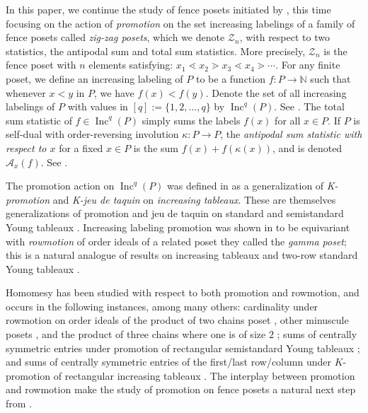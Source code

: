 \documentclass[11pt]{amsart}
\theoremstyle{definition}
\DeclareMathOperator{\Inc}{\mathrm{Inc}}
\begin{document}
In this paper, we continue the study of fence posets initiated by \cite{elizalde2021rowmotion}, this time focusing on the action of \emph{promotion} on the set increasing labelings of a family of fence posets called \emph{zig-zag posets}, which we denote $\mathcal{Z}_n$, with respect to two statistics, the antipodal sum and total sum statistics.
More precisely, $\mathcal{Z}_n$ is the fence poset with $n$ elements satisfying: $x_1\lessdot x_2 \gtrdot x_3\lessdot x_4\gtrdot \cdots$.
For any finite poset, we define an increasing labeling of $P$ to be a function $f: P \to \mathbb{N}$ such that whenever $x < y$ in $P$, we have $f(x) < f(y)$. Denote  the set of all increasing labelings of $P$ with values in $[q]:=\{1,2,\ldots,q\}$ by  $\Inc^q(P)$.
See .
The total sum statistic of $f\in \Inc^q(P)$ simply sums the labels $f(x)$ for all $x\in P$.
If $P$ is self-dual with order-reversing involution $\kappa:P\to P$,  the \emph{antipodal sum statistic with respect to $x$} for a fixed $x \in P$ is the sum $f(x)+f(\kappa(x))$, and is denoted  $\mathcal{A}_x(f)$.
See .



The promotion action on $\Inc^q(P)$ was defined in \cite{dilks2019rowmotion} as a generalization of \emph{K-promotion} \cite{Pechenik2014} and \emph{K-jeu de taquin} on \cite{TY2009} \emph{increasing tableaux}. These are themselves generalizations of promotion and jeu de taquin on standard and semistandard Young tableaux \cite{Sch1972}. Increasing labeling promotion was shown in \cite{dilks2019rowmotion} to be equivariant with \emph{rowmotion} of order ideals of a related poset they called the \emph{gamma poset}; this is a natural analogue of results on increasing tableaux \cite{dilks2017resonance} and two-row standard Young tableaux \cite{SW2012}.

Homomesy has been studied with respect to both promotion and rowmotion, and occurs in the following instances, among many others: cardinality under rowmotion on order ideals of the product of two chains poset \cite{PR2015}, other minuscule posets \cite{RushWang}, and the product of three chains where one is of size $2$ \cite{Vorland};  sums of centrally symmetric entries under promotion of rectangular semistandard Young tableaux \cite{BPS}; and sums of centrally symmetric entries of the first/last row/column under $K$-promotion of rectangular increasing  tableaux \cite{Pechenik2014,Pechenik2017}.  
The interplay between promotion and rowmotion make the study of promotion on fence posets a natural next step from \cite{elizalde2021rowmotion}.
\end{document}
